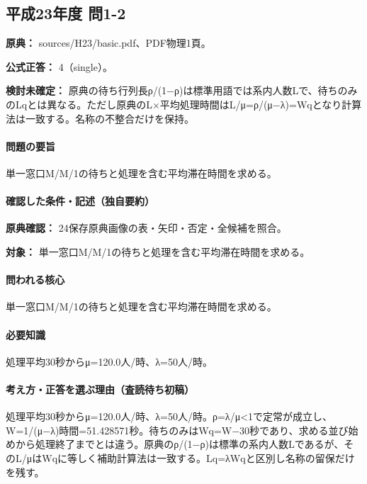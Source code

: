 \subsection{平成23年度 問1-2}
\label{q:h23-reg-basic-1-2}

\noindent\textbf{原典：} sources/H23/basic.pdf、PDF物理1頁。

\textbf{公式正答：} 4（single）。

\par\textbf{検討未確定：} 原典の待ち行列長ρ/(1−ρ)は標準用語では系内人数Lで、待ちのみのLqとは異なる。ただし原典のL×平均処理時間はL/μ=ρ/(μ−λ)=\allowbreak{}Wqとなり計算法は一致する。名称の不整合だけを保持。

\paragraph{問題の要旨} 単一窓口M/M/1の待ちと処理を含む平均滞在時間を求める。

\paragraph{確認した条件・記述（独自要約）}\mbox{}\par

\noindent\textbf{原典確認：} 24保存原典画像の表・矢印・否定・全候補を照合。\par

\noindent\textbf{対象：} 単一窓口M/M/1の待ちと処理を含む平均滞在時間を求める。\par

\paragraph{問われる核心} 単一窓口M/M/1の待ちと処理を含む平均滞在時間を求める。

\paragraph{必要知識} 処理平均30秒からμ=120.0人/時、λ=50人/時。

\paragraph{考え方・正答を選ぶ理由（査読待ち初稿）} 処理平均30秒からμ=120.0人/時、λ=50人/時。ρ=λ/μ<1で定常が成立し、W=\allowbreak{}1/(μ−λ)時間=51.428571秒。待ちのみはWq=\allowbreak{}W−30秒であり、求める並び始めから処理終了までとは違う。原典のρ/(1−ρ)は標準の系内人数Lであるが、そのL/μはWqに等しく補助計算法は一致する。Lq=λWqと区別し名称の留保だけを残す。

